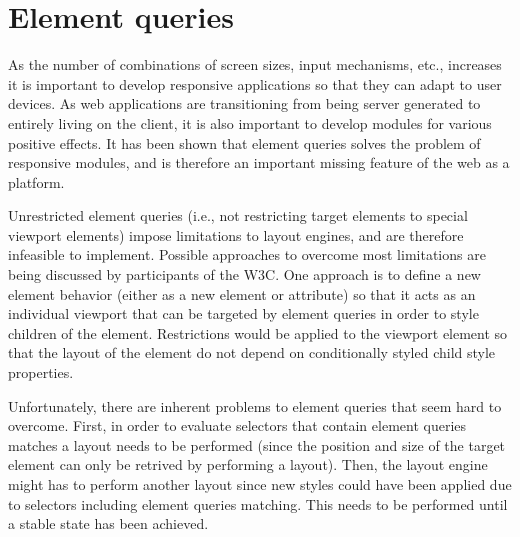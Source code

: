 \documentclass[a4paper,11pt]{kth-mag}
\begin{document}






    \section{Element queries}
    As the number of combinations of screen sizes, input mechanisms, etc., increases it is important to develop \gls{responsive} applications so that they can adapt to user devices.
    As \gls{web} applications are transitioning from being server generated to entirely living on the client, it is also important to develop modules for various positive effects.
    It has been shown that element queries solves the problem of \gls{responsive} modules, and is therefore an important missing feature of the \gls{web} as a platform.

    Unrestricted element queries (i.e., not restricting target \glspl{element} to special \gls{viewport} \glspl{element}) impose limitations to \glspl{layout engine}, and are therefore infeasible to implement.
    Possible approaches to overcome most limitations are being discussed by participants of the W3C.
    One approach is to define a new element behavior (either as a new element or attribute) so that it acts as an individual \gls{viewport} that can be targeted by element queries in order to style children of the \gls{element}.
    Restrictions would be applied to the \gls{viewport} element so that the layout of the element do not depend on conditionally styled child style properties.

    Unfortunately, there are inherent problems to element queries that seem hard to overcome.
    First, in order to evaluate selectors that contain element queries matches a layout needs to be performed (since the position and size of the target element can only be retrived by performing a layout).
    Then, the \gls{layout engine} might has to perform another layout since new styles could have been applied due to selectors including element queries matching.
    This needs to be performed until a stable state has been achieved.
\end{document}
